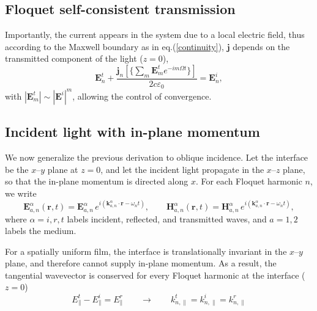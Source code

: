 \documentclass[aps, prb, superscriptaddress, longbibliography]{revtex4-2}
\renewcommand{\epsilon}{\varepsilon}
\numberwithin{equation}{section}
\begin{document}
\subsection{Floquet self-consistent transmission}
Importantly, the current appears in the system due to a local electric field, thus according to the Maxwell boundary as in eq.(\ref{continuity}), $\mathbf{j}$ depends on the transmitted component of the light ($z = 0$), 
\begin{equation}
\boxed{\mathbf E_n^t+\frac{\mathbf j_n\left[\{\sum_m\mathbf{E}^t_m e^{-im\Omega t}\}\right]}{2c\epsilon_0}=\mathbf E_n^i,}
\end{equation}
with $|\mathbf{E}^t_m|\sim |\mathbf{E}^i|^m$, allowing the control of convergence.

\subsection{Incident light with in-plane momentum}

We now generalize the previous derivation to oblique incidence. Let the interface be the $x$--$y$ plane at $z=0$, and let the incident light propagate in the $x$--$z$ plane, so that the in-plane momentum is directed along $x$. For each Floquet harmonic $n$, we write
\begin{equation}
\mathbf E_{a,n}^\alpha(\mathbf r,t)=\mathbf E_{a,n}^\alpha\,e^{i(\mathbf k_{a,n}^\alpha\cdot \mathbf r-\omega_n t)},
\qquad
\mathbf H_{a,n}^\alpha(\mathbf r,t)=\mathbf H_{a,n}^\alpha\,e^{i(\mathbf k_{a,n}^\alpha\cdot \mathbf r-\omega_n t)},
\end{equation}
where $\alpha=i,r,t$ labels incident, reflected, and transmitted waves, and $a=1,2$ labels the medium.

For a spatially uniform film, the interface is translationally invariant in the $x$--$y$ plane, and therefore cannot supply in-plane momentum. As a result, the tangential wavevector is conserved for every Floquet harmonic at the interface ($z=0$)
\begin{equation}
    E_{\|}^t-E_{\|}^i=E_{\|}^r \qquad \rightarrow\qquad k_{n,\|}^t=k_{n,\|}^i=k_{n,\|}^r
\end{equation}
\end{document}
